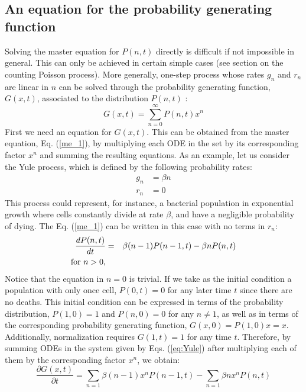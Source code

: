 \documentclass{article}
\begin{document}
\subsection{An equation for the probability generating function}
Solving the master equation for $P(n,t)$ directly is difficult if not impossible in general. This can only be achieved in certain simple cases (see section on the counting Poisson process). More generally, one-step process 
whose rates $g_n$ and $r_n$ are linear in $n$ can be solved through the probability generating function, $G(x,t)$, associated to the distribution $P(n,t)$ \citep{Barlett60}:
\begin{equation}
G(x,t) = \sum_{n=0}^{\infty} P(n,t) x^n
\end{equation}
First we need an equation for $G(x,t)$. This can be obtained from the master equation, Eq. (\ref{me_1}), by multiplying each ODE in the set by its corresponding factor $x^n$ and summing the resulting equations. As an example, let us consider the Yule process, which is defined by the following probability rates:
\begin{align*}
g_n & = \beta n\\
r_n & = 0
\end{align*}
This process could represent, for instance, a bacterial population in exponential growth where cells constantly divide at rate $\beta$, and have a negligible probability of dying. The Eq. (\ref{me_1}) can be written in this case with no terms in $r_n$:    
\begin{eqnarray}
\frac{dP(n,t)}{dt}            & = & \beta (n-1) P(n-1,t) - \beta n P(n,t)         \nonumber \\
\textup{for} \,\, n > 0,      &   &                                               \label{eq:Yule}
\end{eqnarray}
Notice that the equation in $n=0$ is trivial. If we take as the initial condition a population with only once cell, $P(0,t) = 0$ for any later time $t$ since there are no deaths. This initial condition can be expressed in terms of the probability distribution, $P(1,0)=1$ and $P(n,0)=0$ for any $n \not = 1$, as well as in terms of the corresponding probability generating function, $G(x,0) = P(1,0) x = x$. Additionally, normalization requires $G(1,t) = 1$ for any time $t$. Therefore, by summing ODEs in the system given by Eqs. (\ref{eq:Yule}) after multiplying each of them by the corresponding factor $x^n$, we obtain:
\begin{equation}
\frac{\partial G(x,t)}{\partial t} = \sum_{n=1} \beta (n-1) x^n P(n-1,t) - \sum_{n=1} \beta n x^n P(n,t)
\end{equation}
\end{document}
